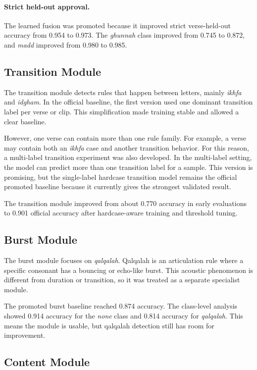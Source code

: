 \documentclass[12pt,a4paper]{report}
\begin{document}
\paragraph{Strict held-out approval.}
The learned fusion was promoted because it improved strict verse-held-out
accuracy from 0.954 to 0.973. The \textit{ghunnah} class improved from 0.745 to
0.872, and \textit{madd} improved from 0.980 to 0.985.

\subsection{Transition Module}

The transition module detects rules that happen between letters, mainly
\textit{ikhfa} and \textit{idgham}. In the official baseline, the first version
used one dominant transition label per verse or clip. This simplification made
training stable and allowed a clear baseline.

However, one verse can contain more than one rule family. For example, a verse
may contain both an \textit{ikhfa} case and another transition behavior. For
this reason, a multi-label transition experiment was also developed. In the
multi-label setting, the model can predict more than one transition label for a
sample. This version is promising, but the single-label hardcase transition
model remains the official promoted baseline because it currently gives the
strongest validated result.

The transition module improved from about 0.770 accuracy in early evaluations
to 0.901 official accuracy after hardcase-aware training and threshold tuning.

\subsection{Burst Module}

The burst module focuses on \textit{qalqalah}. Qalqalah is an articulation rule
where a specific consonant has a bouncing or echo-like burst. This acoustic
phenomenon is different from duration or transition, so it was treated as a
separate specialist module.

The promoted burst baseline reached 0.874 accuracy. The class-level analysis
showed 0.914 accuracy for the \textit{none} class and 0.814 accuracy for
\textit{qalqalah}. This means the module is usable, but qalqalah detection still
has room for improvement.

\subsection{Content Module}
\end{document}
